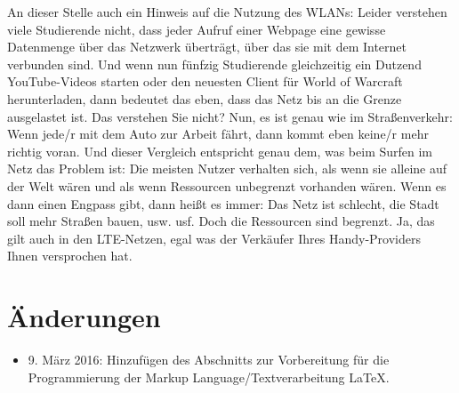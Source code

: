 An dieser Stelle auch ein Hinweis auf die Nutzung des WLANs: Leider verstehen viele Studierende nicht, dass jeder Aufruf einer Webpage eine gewisse Datenmenge über das Netzwerk überträgt, über das sie mit dem Internet verbunden sind. Und wenn nun fünfzig Studierende gleichzeitig ein Dutzend YouTube-Videos starten oder den neuesten Client für World of Warcraft herunterladen, dann bedeutet das eben, dass das Netz bis an die Grenze ausgelastet ist. Das verstehen Sie nicht? Nun, es ist genau wie im Straßenverkehr: Wenn jede/r mit dem Auto zur Arbeit fährt, dann kommt eben keine/r mehr richtig voran. Und dieser Vergleich entspricht genau dem, was beim Surfen im Netz das Problem ist: Die meisten Nutzer verhalten sich, als wenn sie alleine auf der Welt wären und als wenn Ressourcen unbegrenzt vorhanden wären. Wenn es dann einen Engpass gibt, dann heißt es immer: Das Netz ist schlecht, die Stadt soll mehr Straßen bauen, usw. usf. Doch die Ressourcen sind begrenzt. Ja, das gilt auch in den LTE-Netzen, egal was der Verkäufer Ihres Handy-Providers Ihnen versprochen hat.


\section{Änderungen}

\begin{itemize}
	\item 9. März 2016: Hinzufügen des Abschnitts zur Vorbereitung für die Programmierung der Markup Language/Textverarbeitung LaTeX.
\end{itemize}
